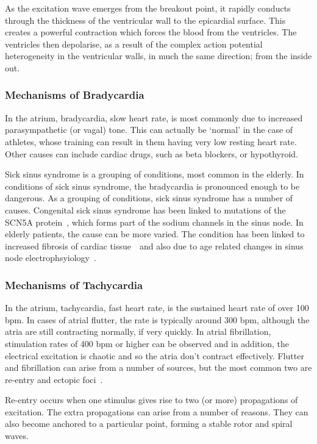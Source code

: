 As the excitation wave emerges from the breakout point, it rapidly conducts
through the thickness of the ventricular wall to the epicardial surface.
This creates a powerful contraction which forces the blood from the ventricles.
The ventricles then depolarise, as a result of the complex action potential
heterogeneity in the ventricular walls, in much the same direction; from the
inside out.

\subsubsection{Mechanisms of Bradycardia}

In the atrium, bradycardia, slow heart rate, is most commonly due to increased
parasympathetic (or vagal) tone.
This can actually be `normal' in the case of athletes, whose training can result
in them having very low resting heart rate.
Other causes can include cardiac drugs, such as beta blockers, or hypothyroid.

Sick sinus syndrome is a grouping of conditions, most common in the elderly.
In conditions of sick sinus syndrome, the bradycardia is pronounced enough to be
dangerous.
As a grouping of conditions, sick sinus syndrome has a number of causes.
Congenital sick sinus syndrome has been linked to mutations of the SCN5A
protein~\cite{Benson2003}, which forms part of the sodium channels in the sinus
node.
In elderly patients, the cause can be more varied.
The condition has been linked to increased fibrosis of cardiac
tissue~\cite{Kohl2005}\ and also due to age related changes in sinus node
electrophsyiology~\cite{Alings1993}.

\subsubsection{Mechanisms of Tachycardia}

In the atrium, tachycardia, fast heart rate, is the sustained heart rate of over
100 bpm.
In cases of atrial flutter, the rate is typically around 300 bpm, although the
atria are still contracting normally, if very quickly.
In atrial fibrillation, stimulation rates of 400 bpm or higher can be observed
and in addition, the electrical excitation is chaotic and so the atria don't
contract effectively.
Flutter and fibrillation can arise from a number of sources, but the most common
two are re-entry and ectopic foci~\cite{Nattel2002,Wyse2004,Mandapati2000,Haissaguerre1998,Tsai2000,Prystowsky2008}.

Re-entry occurs when one stimulus gives rise to two (or more) propagations of
excitation.
The extra propagations can arise from a number of reasons.
They can also become anchored to a particular point, forming a stable rotor and
spiral waves.

